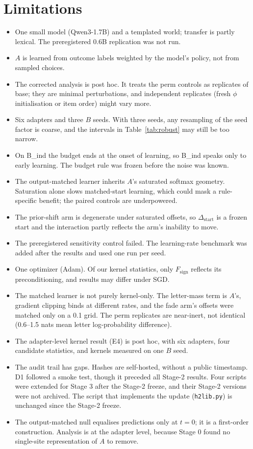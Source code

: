 \documentclass[11pt]{article}
\begin{document}
\section{Limitations}
\begin{itemize}
\item One small model (Qwen3-1.7B) and a templated world; transfer is partly lexical. The preregistered 0.6B replication was not run.
\item $A$ is learned from outcome labels weighted by the model's policy, not from sampled choices.
\item The corrected analysis is post hoc. It treats the perm controls as replicates of base; they are minimal perturbations, and independent replicates (fresh $\phi$ initialisation or item order) might vary more.
\item Six adapters and three $B$ seeds. With three seeds, any resampling of the seed factor is coarse, and the intervals in Table~\ref{tab:robust} may still be too narrow.
\item On B\_ind the budget ends at the onset of learning, so B\_ind speaks only to early learning. The budget rule was frozen before the noise was known.
\item The output-matched learner inherits $A$'s saturated softmax geometry. Saturation alone slows matched-start learning, which could mask a rule-specific benefit; the paired controls are underpowered.
\item The prior-shift arm is degenerate under saturated offsets, so $\Delta_{\text{start}}$ is a frozen start and the interaction partly reflects the arm's inability to move.
\item The preregistered sensitivity control failed. The learning-rate benchmark was added after the results and used one run per seed.
\item One optimizer (Adam). Of our kernel statistics, only $F_{\text{sign}}$ reflects its preconditioning, and results may differ under SGD.
\item The matched learner is not purely kernel-only. The letter-mass term is $A$'s, gradient clipping binds at different rates, and the fade arm's offsets were matched only on a 0.1 grid. The perm replicates are near-inert, not identical (0.6--1.5 nats mean letter log-probability difference).
\item The adapter-level kernel result (E4) is post hoc, with six adapters, four candidate statistics, and kernels measured on one $B$ seed.
\item The audit trail has gaps. Hashes are self-hosted, without a public timestamp. D1 followed a smoke test, though it preceded all Stage-2 results. Four scripts were extended for Stage 3 after the Stage-2 freeze, and their Stage-2 versions were not archived. The script that implements the update (\texttt{h2lib.py}) is unchanged since the Stage-2 freeze.
\item The output-matched null equalises predictions only at $t=0$; it is a first-order construction. Analysis is at the adapter level, because Stage 0 found no single-site representation of $A$ to remove.
\end{itemize}
\end{document}

